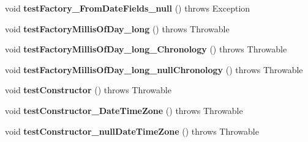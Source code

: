 \begin{DoxyCompactItemize}
\item 
\hypertarget{classorg_1_1joda_1_1time_1_1_test_local_time___constructors_ac4fcd7c702e5d823d0d7a0e41d18ff77}{void {\bfseries test\-Factory\-\_\-\-From\-Date\-Fields\-\_\-null} ()  throws Exception }\label{classorg_1_1joda_1_1time_1_1_test_local_time___constructors_ac4fcd7c702e5d823d0d7a0e41d18ff77}

\item 
\hypertarget{classorg_1_1joda_1_1time_1_1_test_local_time___constructors_ae6c71ad4469f93dccc8b9fe956af1aff}{void {\bfseries test\-Factory\-Millis\-Of\-Day\-\_\-long} ()  throws Throwable }\label{classorg_1_1joda_1_1time_1_1_test_local_time___constructors_ae6c71ad4469f93dccc8b9fe956af1aff}

\item 
\hypertarget{classorg_1_1joda_1_1time_1_1_test_local_time___constructors_a310aceeb435738c26fc5e4b014b4c014}{void {\bfseries test\-Factory\-Millis\-Of\-Day\-\_\-long\-\_\-\-Chronology} ()  throws Throwable }\label{classorg_1_1joda_1_1time_1_1_test_local_time___constructors_a310aceeb435738c26fc5e4b014b4c014}

\item 
\hypertarget{classorg_1_1joda_1_1time_1_1_test_local_time___constructors_ac3b99b5226ffbbf286faef734d6c70ed}{void {\bfseries test\-Factory\-Millis\-Of\-Day\-\_\-long\-\_\-null\-Chronology} ()  throws Throwable }\label{classorg_1_1joda_1_1time_1_1_test_local_time___constructors_ac3b99b5226ffbbf286faef734d6c70ed}

\item 
\hypertarget{classorg_1_1joda_1_1time_1_1_test_local_time___constructors_ac7624237d2c0647311fb1091ba93fdf6}{void {\bfseries test\-Constructor} ()  throws Throwable }\label{classorg_1_1joda_1_1time_1_1_test_local_time___constructors_ac7624237d2c0647311fb1091ba93fdf6}

\item 
\hypertarget{classorg_1_1joda_1_1time_1_1_test_local_time___constructors_ade42bc894bb41f3bfce10684cd285b7c}{void {\bfseries test\-Constructor\-\_\-\-Date\-Time\-Zone} ()  throws Throwable }\label{classorg_1_1joda_1_1time_1_1_test_local_time___constructors_ade42bc894bb41f3bfce10684cd285b7c}

\item 
\hypertarget{classorg_1_1joda_1_1time_1_1_test_local_time___constructors_af4bd8f11b20bc2be6793e1ce7ee05e59}{void {\bfseries test\-Constructor\-\_\-null\-Date\-Time\-Zone} ()  throws Throwable }\label{classorg_1_1joda_1_1time_1_1_test_local_time___constructors_af4bd8f11b20bc2be6793e1ce7ee05e59}


\end{DoxyCompactItemize}
